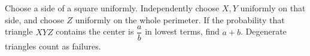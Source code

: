Choose a side of a square uniformly. Independently choose $X,Y$ uniformly on that side, and choose $Z$ uniformly on the whole perimeter. If the probability that triangle $XYZ$ contains the center is $\dfrac{a}{b}$ in lowest terms, find $a+b$. Degenerate triangles count as failures.
